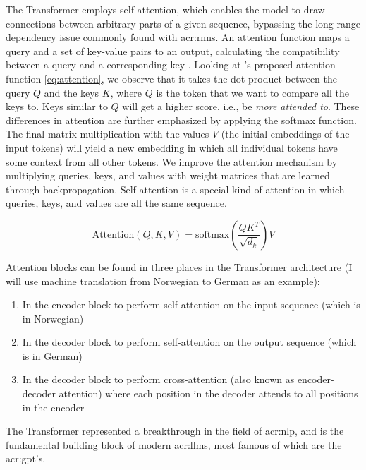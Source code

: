 The Transformer employs self-attention, which enables the model to draw connections between arbitrary parts of a given sequence, bypassing the long-range dependency issue commonly found with \glspl{acr:rnn}. An attention function maps a query and a set of key-value pairs to an output, calculating the compatibility between a query and a corresponding key \citep[3]{vaswaniAttentionAllYou2017}. Looking at \citeauthor{vaswaniAttentionAllYou2017}'s proposed attention function \eqref{eq:attention}, we observe that it takes the dot product between the query $Q$ and the keys $K$, where $Q$ is the token that we want to compare all the keys to. Keys similar to $Q$ will get a higher score, i.e., be \textit{more attended to}. These differences in attention are further emphasized by applying the softmax function. The final matrix multiplication with the values $V$ (the initial embeddings of the input tokens) will yield a new embedding in which all individual tokens have some context from all other tokens. We improve the attention mechanism by multiplying queries, keys, and values with weight matrices that are learned through backpropagation. Self-attention is a special kind of attention in which queries, keys, and values are all the same sequence.


\begin{equation}
    \text{Attention}(Q, K, V) = \text{softmax}\left(\frac{QK^T}{\sqrt{d_k}}\right)V
    \label{eq:attention}
\end{equation}

Attention blocks can be found in three places in the Transformer architecture \citep[5]{vaswaniAttentionAllYou2017} (I will use machine translation from Norwegian to German as an example):

\begin{enumerate}
    \item In the encoder block to perform self-attention on the input sequence (which is in Norwegian)
    \item In the decoder block to perform self-attention on the output sequence (which is in German)
    \item In the decoder block to perform cross-attention (also known as encoder-decoder attention) where each position in the decoder attends to all positions in the encoder
\end{enumerate}

The Transformer represented a breakthrough in the field of \gls{acr:nlp}, and is the fundamental building block of modern \glspl{acr:llm}, most famous of which are the \acrshort{acr:gpt}'s.

